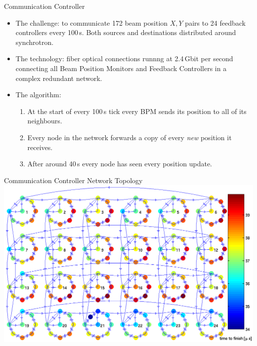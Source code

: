 \documentclass{beamer}
\begin{document}
%
\begin{frame}{Communication Controller}

\begin{itemize}

\item
The challenge: to communicate 172 beam position $X, Y$ pairs to 24 feedback
controllers every 100\,\textmu s.  Both sources and destinations distributed
around synchrotron.

\item
The technology: fiber optical connections runnng at 2.4\,Gbit per second
connecting all Beam Position Monitors and Feedback Controllers in a complex
redundant network.

\item
The algorithm:

\begin{enumerate}
\item At the start of every 100\,\textmu s tick every BPM sends its position to
all of its neighbours.
\item Every node in the network forwards a copy of every \emph{new} position it
receives.
\item After around 40\,\textmu s every node has seen every position update.
\end{enumerate}

\end{itemize}

\end{frame}


%
\begin{frame}{Communication Controller Network Topology}
\includegraphics[width=\linewidth]{fofb}
\end{frame}
\end{document}
